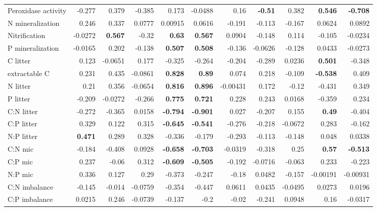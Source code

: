 \documentclass[10pt]{article}
\begin{document}
\begin{flushleft}
\begin{landscape}
\begin{table}[h!]
\begin{center}
{\begin{tabular}{lrrrrrrrrrr}
  Peroxidase activity & -0.277 & 0.379 & -0.385 & 0.173 & -0.0488 & 0.16 & \textbf{ -0.51 } & 0.382 & \textbf{ 0.546 } & \textbf{ -0.708 } \\ 
  N mineralization & 0.246 & 0.337 & 0.0777 & 0.00915 & 0.0616 & -0.191 & -0.113 & -0.167 & 0.0624 & 0.0892 \\ 
  Nitrification & -0.0272 & \textbf{ 0.567 } & -0.32 & \textbf{ 0.63 } & \textbf{ 0.567 } & 0.0904 & -0.148 & 0.114 & -0.105 & -0.0234 \\ 
  P mineralization & -0.0165 & 0.202 & -0.138 & \textbf{ 0.507 } & \textbf{ 0.508 } & -0.136 & -0.0626 & -0.128 & 0.0433 & -0.0273 \\ 
  C litter & 0.123 & -0.0651 & 0.177 & -0.325 & -0.264 & -0.204 & -0.289 & 0.0236 & \textbf{ 0.501 } & -0.348 \\ 
  extractable C & 0.231 & 0.435 & -0.0861 & \textbf{ 0.828 } & \textbf{ 0.89 } & 0.074 & 0.218 & -0.109 & \textbf{ -0.538 } & 0.409 \\ 
  N litter & 0.21 & 0.356 & -0.0654 & \textbf{ 0.816 } & \textbf{ 0.896 } & -0.00431 & 0.172 & -0.12 & -0.431 & 0.349 \\ 
  P litter & -0.209 & -0.0272 & -0.266 & \textbf{ 0.775 } & \textbf{ 0.721 } & 0.228 & 0.243 & 0.0168 & -0.359 & 0.234 \\ 
  C:N litter & -0.272 & -0.365 & 0.0158 & \textbf{ -0.794 } & \textbf{ -0.901 } & 0.027 & -0.207 & 0.155 & \textbf{ 0.49 } & -0.404 \\ 
  C:P litter & 0.329 & 0.122 & 0.315 & \textbf{ -0.645 } & \textbf{ -0.541 } & -0.276 & -0.218 & -0.0672 & 0.283 & -0.162 \\ 
  N:P litter & \textbf{ 0.471 } & 0.289 & 0.328 & -0.336 & -0.179 & -0.293 & -0.113 & -0.148 & 0.048 & 0.0338 \\ 
  C:N mic & -0.184 & -0.408 & 0.0928 & \textbf{ -0.658 } & \textbf{ -0.703 } & -0.0319 & -0.318 & 0.25 & \textbf{ 0.57 } & \textbf{ -0.513 } \\ 
  C:P mic & 0.237 & -0.06 & 0.312 & \textbf{ -0.609 } & \textbf{ -0.505 } & -0.192 & -0.0716 & -0.063 & 0.233 & -0.223 \\ 
  N:P mic & 0.336 & 0.127 & 0.29 & -0.373 & -0.247 & -0.18 & 0.0482 & -0.157 & -0.00191 & -0.00931 \\ 
  C:N imbalance & -0.145 & -0.014 & -0.0759 & -0.354 & -0.447 & 0.0611 & 0.0435 & -0.0495 & 0.0273 & 0.0196 \\ 
  C:P imbalance & 0.0215 & 0.246 & -0.0739 & -0.137 & -0.2 & -0.02 & -0.241 & 0.0948 & 0.16 & -0.0317 \\ 

\end{tabular}}
\end{center}
\end{table}
\end{landscape}
\end{flushleft}
\end{document}

